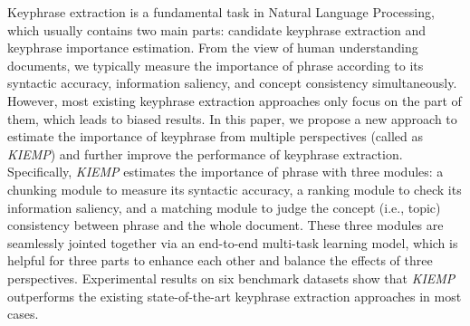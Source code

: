 Keyphrase extraction is a fundamental task in Natural Language Processing, which usually contains two main parts: candidate keyphrase extraction and keyphrase importance estimation. From the view of human understanding documents, we typically measure the importance of phrase according to its syntactic accuracy, information saliency, and concept consistency simultaneously. However, most existing keyphrase extraction approaches only focus on the part of them, which leads to biased results. In this paper, we propose a new approach to estimate the importance of keyphrase from multiple perspectives (called as \textit{KIEMP}) and further improve the performance of keyphrase extraction. Specifically, \textit{KIEMP} estimates the importance of phrase with three modules: a chunking module to measure its syntactic accuracy, a ranking module to check its information saliency, and a matching module to judge the concept (i.e., topic) consistency between phrase and the whole document. These three modules are seamlessly jointed together via an end-to-end multi-task learning model, which is helpful for three parts to enhance each other and balance the effects of three perspectives. Experimental results on six benchmark datasets show that \textit{KIEMP} outperforms the existing state-of-the-art keyphrase extraction approaches in most cases.
